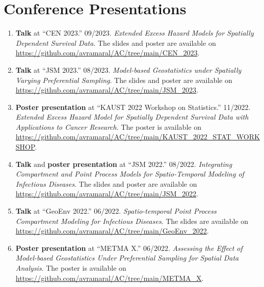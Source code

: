 \documentclass[10pt, ]{article}
\begin{document}
	\vspace{10pt}
	
	\vspace{-12pt}
	\section*{Conference Presentations} \vspace{-5pt}
	
	\begin{enumerate}[noitemsep, topsep=0pt]
		\item \textbf{Talk} at ``CEN 2023.'' 09/2023. \textit{Extended Excess Hazard Models for Spatially Dependent Survival Data}. The slides and poster are available on \href{https://github.com/avramaral/AC/tree/main/CEN\_2023}{\url{https://github.com/avramaral/AC/tree/main/CEN\_2023}}.
		
		\item \textbf{Talk} at ``JSM 2023.'' 08/2023. \textit{Model-based Geostatistics under Spatially Varying Preferential Sampling}. The slides and poster are available on \href{https://github.com/avramaral/AC/tree/main/JSM\_2023}{\url{https://github.com/avramaral/AC/tree/main/JSM\_2023}}.
		
		\item \textbf{Poster presentation} at ``KAUST 2022 Workshop on Statistics.'' 11/2022. \textit{Extended Excess Hazard Model for Spatially Dependent Survival Data with Applications to Cancer Research}. The poster is available on \href{https://github.com/avramaral/AC/tree/main/KAUST_2022_STAT_WORKSHOP}{\url{https://github.com/avramaral/AC/tree/main/KAUST_2022_STAT_WORKSHOP}}.
		
		\item \textbf{Talk} and \textbf{poster presentation} at ``JSM 2022.'' 08/2022. \textit{Integrating Compartment and Point Process Models for Spatio-Temporal Modeling of Infectious Diseases}. The slides and poster are available on \href{https://github.com/avramaral/AC/tree/main/JSM\_2022}{\url{https://github.com/avramaral/AC/tree/main/JSM\_2022}}.
		
		\item \textbf{Talk} at ``GeoEnv 2022.'' 06/2022. \textit{Spatio-temporal Point Process Compartment Modeling for Infectious Diseases}. The slides are available on \href{https://github.com/avramaral/AC/tree/main/GeoEnv\_2022}{\url{https://github.com/avramaral/AC/tree/main/GeoEnv\_2022}}.
		
		\item \textbf{Poster presentation} at ``METMA X.'' 06/2022. \textit{Assessing the Effect of Model-based Geostatistics Under Preferential Sampling for Spatial Data Analysis}. The poster is available on \href{https://github.com/avramaral/AC/tree/main/METMA\_X}{\url{https://github.com/avramaral/AC/tree/main/METMA\_X}}.
		

\end{enumerate}
\end{document}
